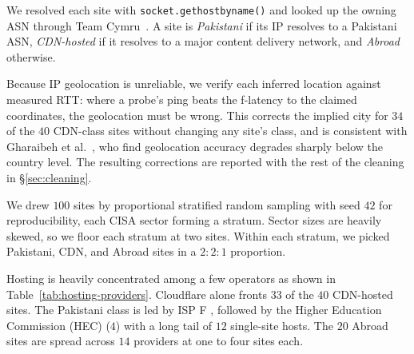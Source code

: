 \documentclass[sigconf,anonymous,10pt]{acmart}
\begin{document}
We resolved each site with \texttt{socket.gethostbyname()} and looked up the owning ASN through Team Cymru~\cite{cymru}. A site is \textit{Pakistani} if its IP resolves to a Pakistani ASN, \textit{CDN-hosted} if it resolves to a major content delivery network, and \textit{Abroad} otherwise.

Because IP geolocation is unreliable, we verify each inferred location against measured RTT: where a probe's ping beats the f-latency to the claimed coordinates, the geolocation must be wrong. This corrects the implied city for $34$ of the $40$ CDN-class sites without changing any site's class, and is consistent with Gharaibeh et al.~\cite{gharaibeh:imc:2011}, who find geolocation accuracy degrades sharply below the country level. The resulting corrections are reported with the rest of the cleaning in \S\ref{sec:cleaning}.

We drew $100$ sites by proportional stratified random sampling with seed $42$ for reproducibility, each CISA sector forming a stratum. Sector sizes are heavily skewed, so we floor each stratum at two sites. Within each stratum, we picked Pakistani, CDN, and Abroad sites in a $2:2:1$ proportion.

Hosting is heavily concentrated among a few operators as shown in Table~\ref{tab:hosting-providers}. Cloudflare alone fronts $33$ of the $40$ CDN-hosted sites. The Pakistani class is led by ISP F , followed by the Higher Education Commission (HEC) ($4$) with a long tail of $12$ single-site hosts. The $20$ Abroad sites are spread across $14$ providers at one to four sites each.


\end{document}
